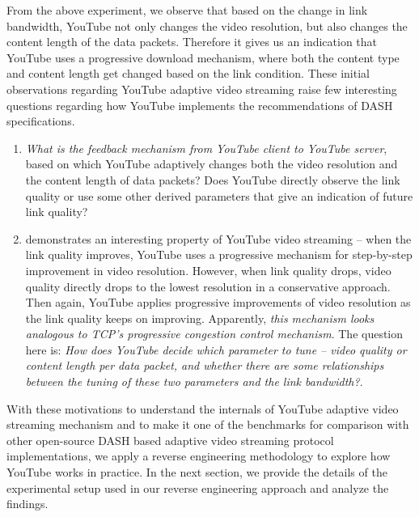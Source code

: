 From the above experiment, we observe that based on the change in link bandwidth, YouTube not only changes the video resolution, but also changes the content length of the data packets. Therefore it gives us an indication that YouTube uses a progressive download mechanism, where both the content type and content length get changed based on the link condition. These initial observations regarding YouTube adaptive video streaming raise few interesting questions regarding how YouTube implements the recommendations of DASH specifications. 
\begin{enumerate}
	\item {\em What is the feedback mechanism from YouTube client to YouTube server}, based on which YouTube adaptively changes both the video resolution and the content length of data packets?  Does YouTube directly observe the link quality or use some other derived parameters that give an indication of future link quality? 
	\item \fig{\ref{fig:reso}} demonstrates an interesting property of YouTube video streaming -- when the link quality improves, YouTube uses a progressive mechanism for step-by-step improvement in video resolution. However, when link quality drops, video quality directly drops to the lowest resolution in a conservative approach. Then again, YouTube applies progressive improvements of video resolution as the link quality keeps on improving. Apparently, {\em this mechanism looks analogous to TCP's progressive congestion control mechanism}. The question here is: {\em How does YouTube decide which parameter to tune -- video quality or content length per data packet, and whether there are some relationships between the tuning of these two parameters and the link bandwidth?}.  
\end{enumerate}

With these motivations to understand the internals of YouTube adaptive video streaming mechanism and to make it one of the benchmarks for comparison with other open-source DASH based adaptive video streaming protocol implementations, we apply a reverse engineering methodology to explore how YouTube works in practice. In the next section, we provide the details of the experimental setup used in our reverse engineering approach and analyze the findings.


